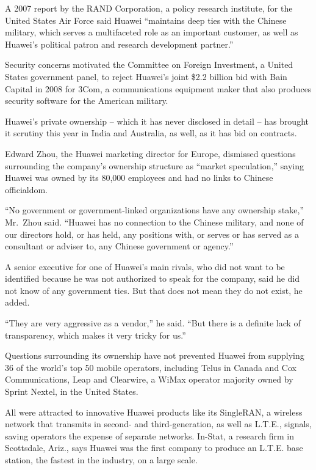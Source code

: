 ﻿\documentclass[12pt]{article}
\begin{document}
A 2007 report by the RAND Corporation, a policy research institute, for the United States Air Force
said Huawei ``maintains deep ties with the Chinese military, which serves a multifaceted role as an
important customer, as well as Huawei's political patron and research development partner.''

Security concerns motivated the Committee on Foreign Investment, a United States government panel,
to reject Huawei's joint \$2.2 billion bid with Bain Capital in 2008 for 3Com, a communications
equipment maker that also produces security software for the American military.

Huawei's private ownership -- which it has never disclosed in detail -- has brought it scrutiny this
year in India and Australia, as well, as it has bid on contracts.

Edward Zhou, the Huawei marketing director for Europe, dismissed questions surrounding the company's
ownership structure as ``market speculation,'' saying Huawei was owned by its 80,000 employees and
had no links to Chinese officialdom.

``No government or government-linked organizations have any ownership stake,'' Mr.~Zhou said.
``Huawei has no connection to the Chinese military, and none of our directors hold, or has held, any
positions with, or serves or has served as a consultant or adviser to, any Chinese government or
agency.''

A senior executive for one of Huawei's main rivals, who did not want to be identified because he was
not authorized to speak for the company, said he did not know of any government ties. But that does
not mean they do not exist, he added.

``They are very aggressive as a vendor,'' he said. ``But there is a definite lack of transparency,
which makes it very tricky for us.''

Questions surrounding its ownership have not prevented Huawei from supplying 36 of the world's top
50 mobile operators, including Telus in Canada and Cox Communications, Leap and Clearwire, a WiMax
operator majority owned by Sprint Nextel, in the United States.

All were attracted to innovative Huawei products like its SingleRAN, a wireless network that
transmits in second- and third-generation, as well as L.T.E., signals, saving operators the expense
of separate networks. In-Stat, a research firm in Scottsdale, Ariz., says Huawei was the first
company to produce an L.T.E. base station, the fastest in the industry, on a large scale.
\end{document}

